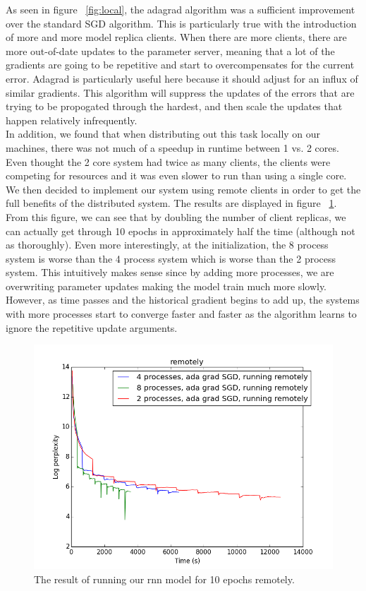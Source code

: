 \documentclass[11pt]{article}
\begin{document}
\noindent As seen in figure ~\ref{fig:local}, the adagrad algorithm was a sufficient improvement over the standard SGD algorithm. This is particularly true with the introduction of more and more model replica clients. When there are more clients, there are more out-of-date updates to the parameter server, meaning that a lot of the gradients are going to be repetitive and start to overcompensates for the current error. Adagrad is particularly useful here because it should adjust for an influx of similar gradients. This algorithm will suppress the updates of the errors that are trying to be propogated through the hardest, and then scale the updates that happen relatively infrequently. \\

\noindent In addition, we found that when distributing out this task locally on our machines, there was not much of a speedup in runtime between 1 vs. 2 cores. Even thought the 2 core system had twice as many clients, the clients were competing for resources and it was even slower to run than using a single core. \\

\noindent We then decided to implement our system using remote clients in order to get the full benefits of the distributed system. The results are displayed in figure ~\ref{fig:remote}. From this figure, we can see that by doubling the number of client replicas, we can actually get through 10 epochs in approximately half the time (although not as thoroughly). Even more interestingly, at the initialization, the 8 process system is worse than the 4 process system which is worse than the 2 process system. This intuitively makes sense since by adding more processes, we are overwriting parameter updates making the model train much more slowly. However, as time passes and the historical gradient begins to add up, the systems with more processes start to converge faster and faster as the algorithm learns to ignore the repetitive update arguments. \\

\begin{figure}[!htb]
  \centering
      \includegraphics[scale = .5]{./images/remotely}
  \caption{The result of running our rnn model for 10 epochs remotely.}
    \label{fig:remote}
\end{figure}
\end{document}
